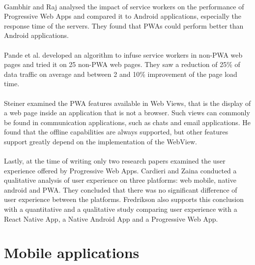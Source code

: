 \documentclass{kththesis}
\begin{document}
\paragraph{}
Gambhir and Raj \cite{gambhir2018analysis} analysed the impact of service workers on the performance of Progressive Web Apps and compared it to Android applications, especially the response time of the servers. They found that PWAs could perform better than Android applications.

\paragraph{}
Pande et al.\cite{pande2018enhanced} developed an algorithm to infuse service workers in non-PWA web pages and tried it on 25 non-PWA web pages. They saw a reduction of 25\% of data traffic on average and between 2 and 10\% improvement of the page load time.

\paragraph{}
Steiner \cite{steiner2018web} examined the PWA features available in Web Views, that is the display of a web page inside an application that is not a browser. Such views can commonly be found in communication applications, such as chats and email applications. He found that the offline capabilities are always supported, but other features support greatly depend on the implementation of the WebView.

\paragraph{}
Lastly, at the time of writing only two research papers examined the user experience offered by Progressive Web Apps. Cardieri and Zaina \cite{PWA_UX_comparison_study} conducted a qualitative analysis of user experience on three platforms: web mobile, native android and PWA. They concluded that there was no significant difference of user experience between the platforms. Fredrikson \cite{emulating_native_w_crossplatform} also supports this conclusion with a quantitative and a qualitative study comparing user experience with a React Native App, a Native Android App and a Progressive Web App. 



\section{Mobile applications}
\end{document}
